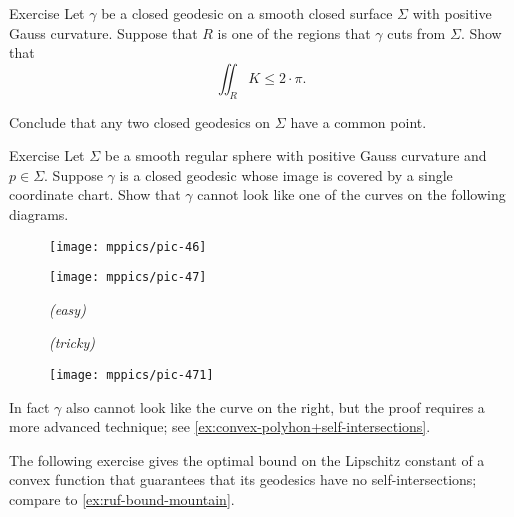 
\begin{thm}{Exercise}\label{ex:closed-geodesic}
Let $\gamma$ be a closed geodesic on a smooth closed surface $\Sigma$ with positive Gauss curvature.
Suppose that $R$ is one of the regions that $\gamma$ cuts from $\Sigma$.
Show that 
\[\iint_R K\le 2\cdot\pi.\]

Conclude that any two closed geodesics on $\Sigma$ have a common point.
\end{thm}

\begin{thm}{Exercise}\label{ex:self-intersections}
Let $\Sigma$ be a smooth regular sphere with positive Gauss curvature and $p\in\Sigma$. 
Suppose $\gamma$ is a closed geodesic whose image is covered by a single coordinate chart.
Show that $\gamma$ cannot look like one of the curves on the following diagrams.

\begin{figure}[h]
\begin{minipage}{.48\textwidth}
\centering
\texttt{[image: mppics/pic-46]}
\end{minipage}
\hfill
\begin{minipage}{.48\textwidth}
\centering
\texttt{[image: mppics/pic-47]}
\end{minipage}

\medskip

\begin{minipage}{.48\textwidth}
\centering
\caption*{\textit{(easy)}}
\end{minipage}\hfill
\begin{minipage}{.48\textwidth}
\centering
\caption*{\textit{(tricky)}}
\end{minipage}
\vskip-4mm
\end{figure}

\end{thm}


\begin{wrapfigure}{r}{30 mm}
\vskip-0mm
\centering
\texttt{[image: mppics/pic-471]}
\end{wrapfigure}

In fact $\gamma$ also cannot look like the curve on the right, but the proof requires a more advanced technique;
see \ref{ex:convex-polyhon+self-intersections}.

The following exercise gives the optimal bound on the Lipschitz constant of a convex function that guarantees that its geodesics have no self-intersections;
compare to \ref{ex:ruf-bound-mountain}.

